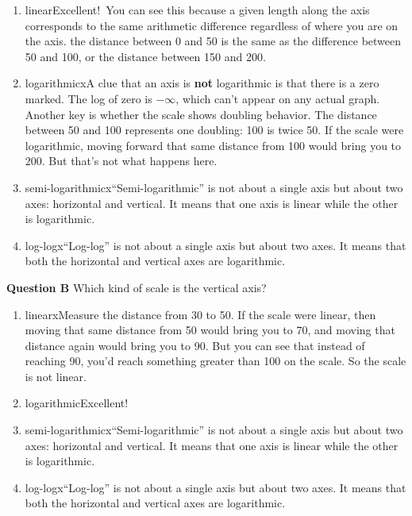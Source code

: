 \documentclass[
  letterpaper,
  DIV=11,
  numbers=noendperiod,
  oneside]{article}
\providecommand{\tightlist}{%
  \setlength{\itemsep}{0pt}\setlength{\parskip}{0pt}}\usepackage{longtable,booktabs,array}
\begin{document}
\begin{multicols}{2}
\begin{enumerate}
\def\labelenumi{\roman{enumi}.}
\tightlist
\item
  {linear{Excellent!~You can see this because a given length along the
  axis corresponds to the same arithmetic difference regardless of where
  you are on the axis. the distance between 0 and 50 is the same as the
  difference between 50 and 100, or the distance between 150 and
  200.}}\\
\item
  {logarithmic{xA clue that an axis is \textbf{not} logarithmic is
  that there is a zero marked. The log of zero is \(-\infty\), which
  can't appear on any actual graph. Another key is whether the scale
  shows doubling behavior. The distance between 50 and 100 represents
  one doubling: 100 is twice 50. If the scale were logarithmic, moving
  forward that same distance from 100 would bring you to 200. But that's
  not what happens here.}}\\
\item
  {semi-logarithmic{x``Semi-logarithmic'' is not about a single axis
  but about two axes: horizontal and vertical. It means that one axis is
  linear while the other is logarithmic.}}\\
\item
  {log-log{x``Log-log'' is not about a single axis but about two axes.
  It means that both the horizontal and vertical axes are logarithmic.}}
\end{enumerate}

\textbf{Question B} Which kind of scale is the vertical axis?

\begin{enumerate}
\def\labelenumi{\roman{enumi}.}
\tightlist
\item
  {linear{xMeasure the distance from 30 to 50. If the scale were
  linear, then moving that same distance from 50 would bring you to 70,
  and moving that distance again would bring you to 90. But you can see
  that instead of reaching 90, you'd reach something greater than 100 on
  the scale. So the scale is not linear.}}\\
\item
  {logarithmic{Excellent!~}}\\
\item
  {semi-logarithmic{x``Semi-logarithmic'' is not about a single axis
  but about two axes: horizontal and vertical. It means that one axis is
  linear while the other is logarithmic.}}\\
\item
  {log-log{x``Log-log'' is not about a single axis but about two axes.
  It means that both the horizontal and vertical axes are logarithmic.}}
\end{enumerate}


\end{multicols}
\end{document}
